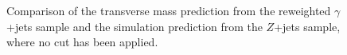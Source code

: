 \begin{figure}[!htbp]
\begin{center}
\caption{Comparison of the transverse mass prediction from the reweighted $\gamma$+jets sample 
and the simulation prediction from the $Z$+jets sample, where no \met cut has been applied.}
\label{fig:PhotonJetsClosureTest_MtHZZ_NoMetCut}
\end{center}
\end{figure}

